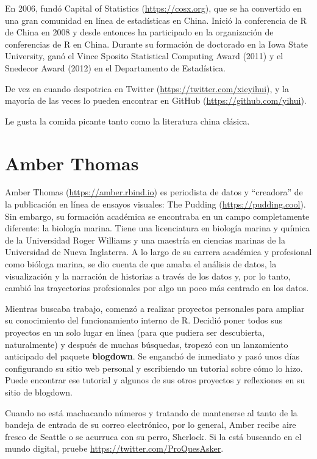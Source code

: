 \documentclass[12pt,]{krantz}
\theoremstyle{definition}
\theoremstyle{definition}
\theoremstyle{definition}
\theoremstyle{remark}
\begin{document}
En 2006, fundó Capital of Statistics (\url{https://cosx.org}), que se ha
convertido en una gran comunidad en línea de estadísticas en China.
Inició la conferencia de R de China en 2008 y desde entonces ha
participado en la organización de conferencias de R en China. Durante su
formación de doctorado en la Iowa State University, ganó el Vince
Sposito Statistical Computing Award (2011) y el Snedecor Award (2012) en
el Departamento de Estadística.

De vez en cuando despotrica en Twitter
(\url{https://twitter.com/xieyihui}), y la mayoría de las veces lo
pueden encontrar en GitHub (\url{https://github.com/yihui}).

Le gusta la comida picante tanto como la literatura china clásica.

\hypertarget{amber-thomas}{%
\section*{Amber Thomas}\label{amber-thomas}}


Amber Thomas (\url{https://amber.rbind.io}) es periodista de datos y
``creadora'' de la publicación en línea de ensayos visuales: The Pudding
(\url{https://pudding.cool}). Sin embargo, su formación académica se
encontraba en un campo completamente diferente: la biología marina.
Tiene una licenciatura en biología marina y química de la Universidad
Roger Williams y una maestría en ciencias marinas de la Universidad de
Nueva Inglaterra. A lo largo de su carrera académica y profesional como
bióloga marina, se dio cuenta de que amaba el análisis de datos, la
visualización y la narración de historias a través de los datos y, por
lo tanto, cambió las trayectorias profesionales por algo un poco más
centrado en los datos.

Mientras buscaba trabajo, comenzó a realizar proyectos personales para
ampliar su conocimiento del funcionamiento interno de R. Decidió poner
todos sus proyectos en un solo lugar en línea (para que pudiera ser
descubierta, naturalmente) y después de muchas búsquedas, tropezó con un
lanzamiento anticipado del paquete \textbf{blogdown}. Se enganchó de
inmediato y pasó unos días configurando su sitio web personal y
escribiendo un tutorial sobre cómo lo hizo. Puede encontrar ese tutorial
y algunos de sus otros proyectos y reflexiones en su sitio de blogdown.

Cuando no está machacando números y tratando de mantenerse al tanto de
la bandeja de entrada de su correo electrónico, por lo general, Amber
recibe aire fresco de Seattle o se acurruca con su perro, Sherlock. Si
la está buscando en el mundo digital, pruebe
\url{https://twitter.com/ProQuesAsker}.
\end{document}
